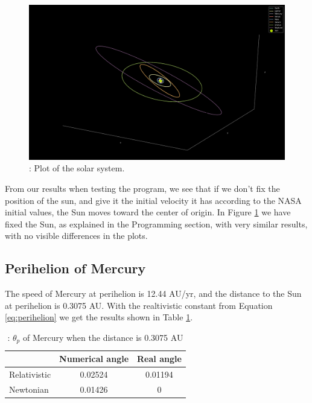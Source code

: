 \documentclass{article}
\begin{document}
\begin{figure}[H]
    \begin{center}
        \includegraphics[width=1.2\textwidth]{./Plot/Solar_System.png}
        \caption{: Plot of the solar system.}
        \label{fig:solar}
    \end{center}
\end{figure}

From our results when testing the program, we see that if we don't fix the position of the sun, and give it the initial velocity it has according to the NASA initial values, the Sun moves toward the center of origin. In Figure \ref{fig:solar} we have fixed the Sun, as explained in the Programming section, with very similar results, with no visible differences in the plots.


\subsection{Perihelion of Mercury}
The speed of Mercury at perihelion is 12.44 AU/yr, and the distance to the Sun at perihelion is 0.3075 AU. With the realtivistic constant from Equation \ref{eq:perihelion} we get the results shown in Table \ref{tab:perihelion}.

\begin{table}[h!]
    \caption{: $\theta_p$ of Mercury when the distance is 0.3075 AU}
    \label{tab:perihelion}
    \centering
    \begin{tabular}{l c c}

              & Numerical angle & Real angle\\
        \hline
        Relativistic    & 0.02524 & 0.01194 \\
        Newtonian   & 0.01426  &  0 \\
        \hline
    \end{tabular}
\end{table}
\end{document}
